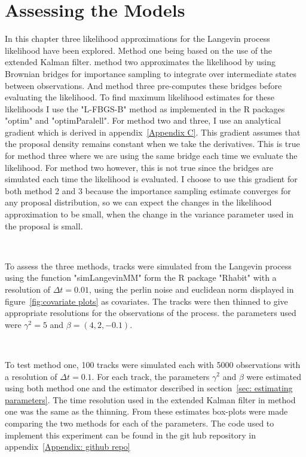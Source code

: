 \section{Assessing the Models}
\label{sec: assessing the models}
 In this chapter three likelihood approximations for the Langevin process likelihood have been explored. Method one being based on the use of the extended Kalman filter. method two approximates the likelihood by using Brownian bridges for importance sampling to integrate over intermediate states between observations. And method three pre-computes these bridges before evaluating the likelihood. To find maximum likelihood estimates for these likelihoods I use the "L-FBGS-B" method as implemented in the R packages "optim" and "optimParalell". For method two and three, I use an analytical gradient which is derived in appendix~\ref{Appendix C}. This gradient assumes that the proposal density remains constant when we take the derivatives. This is true for method three where we are using the same bridge each time we evaluate the likelihood. For method two however, this is not true since the bridges are simulated each time the likelihood is evaluated. I choose to use this gradient for both method 2 and 3 because the importance sampling estimate converges for any proposal distribution, so we can expect the changes in the likelihood approximation to be small, when the change in the variance parameter used in the proposal is small.

\

To assess the three methods, tracks were simulated from the Langevin process using the function "simLangevinMM" form the R package "Rhabit"\cite{michelot_langevin_2019} with a resolution of $\Delta t = 0.01$, using the perlin noise and euclidean norm displayed in figure~\ref{fig:covariate plots} as covariates. The tracks were then thinned to give appropriate resolutions for the observations of the process. the parameters used were $\gamma^2 = 5$ and $\beta=(4,2,-0.1)$.

\

To test method one, 100 tracks were simulated each with 5000 observations with a resolution of $\Delta t = 0.1$. For each track, the parameters $\gamma^2$ and $\beta$ were estimated using both method one and the estimator described in section~\ref{sec: estimating parameters}. The time resolution used in the extended Kalman filter in method one was the same as the thinning. From these estimates box-plots were made comparing the two methods for each of the parameters. The code used to implement this experiment can be found in the git hub repository in appendix~\ref{Appendix: github repo}

